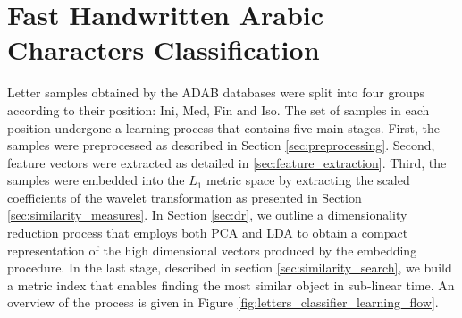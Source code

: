 %
%
%
%
%
%



\chapter{Fast Handwritten Arabic Characters Classification}
\label{chap:characters_classification}

\iftoggle{edit-mode}{\hspace{0pt}\marginpar{The learning process}}{}
Letter samples obtained by the ADAB databases were split into four groups according to their position: Ini, Med, Fin and Iso. 
The set of samples in each position undergone a learning process that contains five main stages.
First, the samples were preprocessed as described in Section \ref{sec:preprocessing}.
Second, feature vectors were extracted as detailed in \ref{sec:feature_extraction}.
Third, the samples were embedded into the $L_1$ metric space by extracting the scaled coefficients of the wavelet transformation as presented in Section \ref{sec:similarity_measures}. 
In Section \ref{sec:dr}, we outline a dimensionality reduction process that employs both PCA and LDA to obtain a compact representation of the high dimensional vectors produced by the embedding procedure.
In the last stage, described in section \ref{sec:similarity_search}, we build a metric index that enables finding the most similar object in sub-linear time.
An overview of the process is given in Figure \ref{fig:letters_classifier_learning_flow}.

